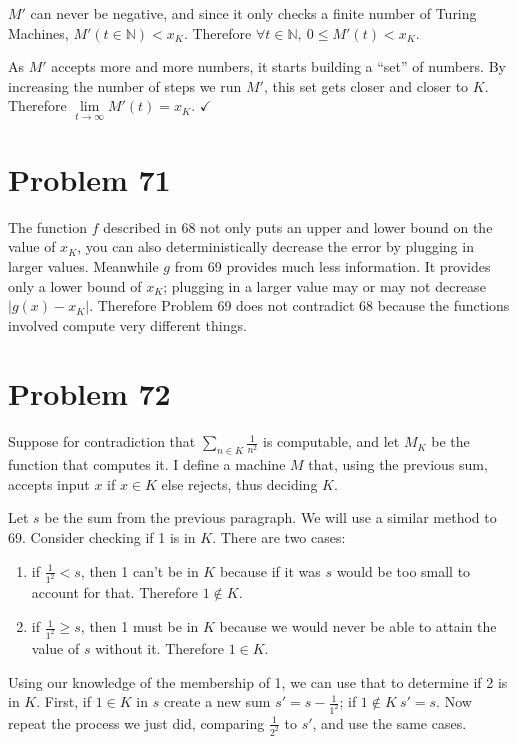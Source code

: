\documentclass[11pt]{article}
\let\imp\rightarrow
\begin{document}
$M'$ can never be negative, and since it only checks a finite number of Turing Machines, $M'(t \in \mathbb{N}) < x_K$.
Therefore $\forall t \in \mathbb{N},\ 0 \leq M'(t) < x_K$.

As $M'$ accepts more and more numbers, it starts building a ``set'' of numbers.
By increasing the number of steps we run $M'$, this set gets closer and closer to $K$.
Therefore $\lim \limits _{t \imp \infty} M'(t) = x_K$. $\checkmark$


\section*{Problem 71}

The function $f$ described in 68 not only puts an upper and lower bound on the value of $x_K$, you can also deterministically decrease the error by plugging in larger values.
Meanwhile $g$ from 69 provides much less information. It provides only a lower bound of $x_K$; plugging in a larger value may or may not decrease $|g(x) - x_K|$.
Therefore Problem 69 does not contradict 68 because the functions involved compute very different things.


\section*{Problem 72}

Suppose for contradiction that $\sum _{n \in K} \frac{1}{n^2}$ is computable, and let $M_K$ be the function that computes it.
I define a machine $M$ that, using the previous sum, accepts input $x$ if $x \in K$ else rejects, thus deciding $K$.

Let $s$ be the sum from the previous paragraph.
We will use a similar method to 69.
Consider checking if 1 is in $K$. There are two cases:
\begin{enumerate}
	\item if $\frac{1}{1^2} < s$, then 1 can't be in $K$ because if it was $s$ would be too small to account for that. 
	Therefore $1 \notin K$.
	\item if $\frac{1}{1^2} \geq s$, then 1 must be in $K$ because we would never be able to attain the value of $s$ without it.
	Therefore $1 \in K$.
\end{enumerate}
Using our knowledge of the membership of 1, we can use that to determine if 2 is in $K$.
First, if $1 \in K$ in $s$ create a new sum $s' = s - \frac{1}{1^2}$; if $1 \notin K\ s' = s$.
Now repeat the process we just did, comparing $\frac{1}{2^2}$ to $s'$, and use the same cases.
\end{document}
